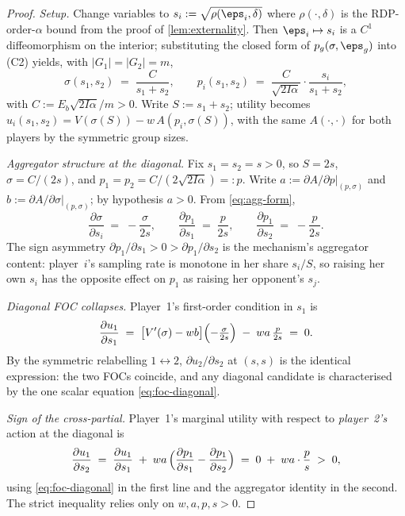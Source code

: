 \begin{proof}
\emph{Setup.} Change variables to $s_i := \sqrt{\rho(\eps_i, \delta)}$
where $\rho(\cdot,\delta)$ is the RDP-order-$\alpha$ bound from the proof
of \cref{lem:externality}. Then $\eps_i \mapsto s_i$ is a $C^1$
diffeomorphism on the interior; substituting the closed form of
$p_g(\sigma,\eps_g)$ into (C2) yields, with $|G_1| = |G_2| = m$,
\begin{equation}
\sigma(s_1, s_2) \;=\; \frac{C}{s_1 + s_2},
\qquad
p_i(s_1, s_2) \;=\; \frac{C}{\sqrt{2 I \alpha}}\cdot\frac{s_i}{s_1 + s_2},
\label{eq:agg-form}
\end{equation}
with $C := E_b \sqrt{2 I \alpha}/m > 0$. Write $S := s_1 + s_2$; utility
becomes $u_i(s_1, s_2) = V(\sigma(S)) - w\, A(p_i, \sigma(S))$, with the
same $A(\cdot,\cdot)$ for both players by the symmetric group sizes.

\emph{Aggregator structure at the diagonal.} Fix $s_1 = s_2 = s > 0$, so
$S = 2s$, $\sigma = C/(2s)$, and $p_1 = p_2 = C/(2\sqrt{2 I\alpha}) =: p$.
Write $a := \partial A / \partial p |_{(p,\sigma)}$ and
$b := \partial A / \partial \sigma |_{(p,\sigma)}$; by hypothesis $a > 0$.
From \eqref{eq:agg-form},
\[
\frac{\partial \sigma}{\partial s_i} \;=\; -\frac{\sigma}{2 s},
\qquad
\frac{\partial p_1}{\partial s_1} \;=\; \frac{p}{2s},
\qquad
\frac{\partial p_1}{\partial s_2} \;=\; -\frac{p}{2s}.
\]
The sign asymmetry $\partial p_1 / \partial s_1 > 0 > \partial p_1 /
\partial s_2$ is the mechanism's aggregator content: player~$i$'s
sampling rate is monotone in her share $s_i/S$, so raising her own
$s_i$ has the opposite effect on $p_1$ as raising her opponent's $s_j$.

\emph{Diagonal FOC collapses.} Player~1's first-order condition in $s_1$
is
\begin{equation}
\frac{\partial u_1}{\partial s_1}
\;=\; \bigl[V'(\sigma) - w b\bigr] \Bigl(-\tfrac{\sigma}{2 s}\Bigr)
    \;-\; w a \,\tfrac{p}{2 s}
\;=\; 0.
\label{eq:foc-diagonal}
\end{equation}
By the symmetric relabelling $1\leftrightarrow 2$, $\partial u_2 /
\partial s_2$ at $(s,s)$ is the identical expression: the two FOCs
coincide, and any diagonal candidate is characterised by the one scalar
equation \eqref{eq:foc-diagonal}.

\emph{Sign of the cross-partial.} Player~1's marginal utility with respect
to \emph{player~2's} action at the diagonal is
\[
\frac{\partial u_1}{\partial s_2}
\;=\; \frac{\partial u_1}{\partial s_1}
   \;+\; w a\, \Bigl(\frac{\partial p_1}{\partial s_1} - \frac{\partial
   p_1}{\partial s_2}\Bigr)
\;=\; 0 \;+\; w a \cdot \frac{p}{s}
\;>\; 0,
\]
using \eqref{eq:foc-diagonal} in the first line and the aggregator
identity in the second. The strict inequality relies only on $w,a,p,s>0$.


\end{proof}
